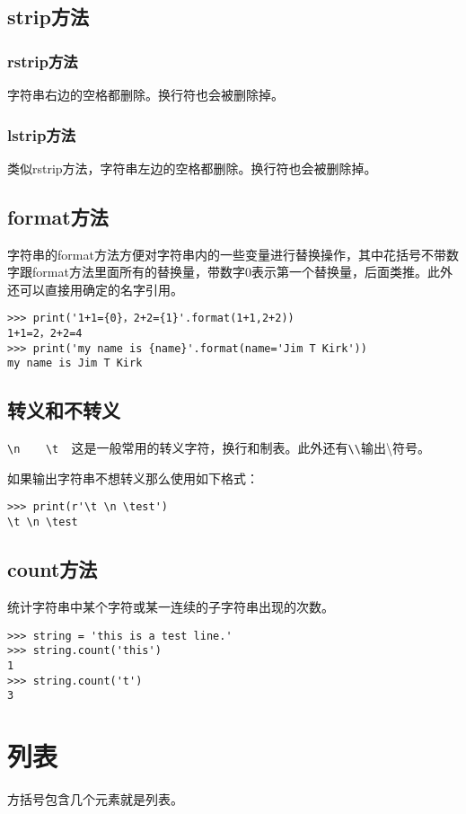 \documentclass[12pt,oneside]{book}
\begin{document}
\begin{common-format}
\subsection{strip方法}

\subsubsection{rstrip方法}
字符串右边的空格都删除。换行符也会被删除掉。

\subsubsection{lstrip方法}
类似rstrip方法，字符串左边的空格都删除。换行符也会被删除掉。


\subsection{format方法}
字符串的format方法方便对字符串内的一些变量进行替换操作，其中花括号不带数字跟format方法里面所有的替换量，带数字0表示第一个替换量，后面类推。此外还可以直接用确定的名字引用。
\begin{Verbatim}
>>> print('1+1={0}，2+2={1}'.format(1+1,2+2))
1+1=2，2+2=4
>>> print('my name is {name}'.format(name='Jim T Kirk'))
my name is Jim T Kirk
\end{Verbatim}

\subsection{转义和不转义}
\verb+\n    \t  +这是一般常用的转义字符，换行和制表。此外还有\verb+\\+输出\textbackslash 符号。

如果输出字符串不想转义那么使用如下格式：
\begin{Verbatim}
>>> print(r'\t \n \test')
\t \n \test
\end{Verbatim}

\subsection{count方法}
统计字符串中某个字符或某一连续的子字符串出现的次数。
\begin{Verbatim}
>>> string = 'this is a test line.'
>>> string.count('this')
1
>>> string.count('t')
3
\end{Verbatim}


\section{列表}
方括号包含几个元素就是列表。



\end{common-format}
\end{document}
